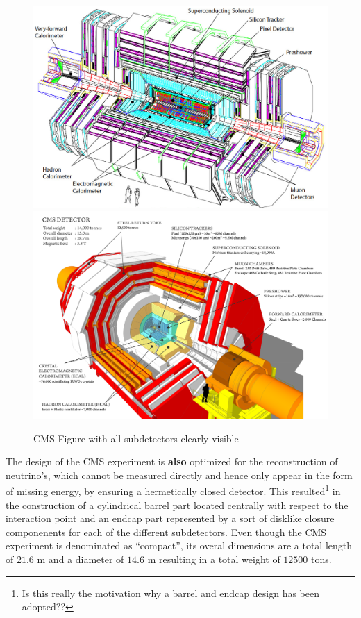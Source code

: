 \begin{figure}[h!t]
 \centering
 \includegraphics[width = 0.8 \textwidth]{Chapters/Chapter2_CERN/Figures/cms.png} \\ %
 \includegraphics[width = 0.8 \textwidth]{Chapters/Chapter2_CERN/Figures/cms_MuchText.png}%
 \caption{CMS Figure with all subdetectors clearly visible} \label{fig::CMSFig}
\end{figure}

The design of the CMS experiment is \textbf{also} optimized for the reconstruction of neutrino's, which cannot be measured directly and hence only appear in the form of missing energy, by ensuring a hermetically closed detector. This resulted\footnote{Is this really the motivation why a barrel and endcap design has been adopted??} in the construction of a cylindrical barrel part located centrally with respect to the interaction point and an endcap part represented by a sort of disklike closure componenents for each of the different subdetectors.
Even though the CMS experiment is denominated as ``compact'', its overal dimensions are a total length of $21.6$ m and a diameter of $14.6$ m resulting in a total weight of $12500$ tons.

